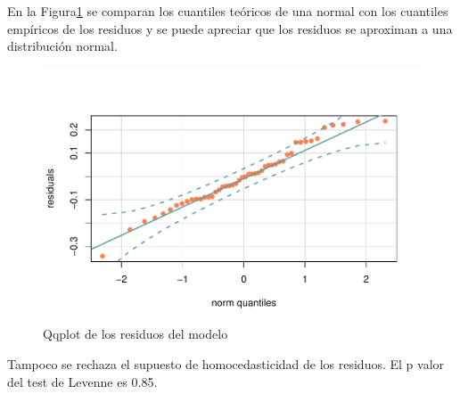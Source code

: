 \documentclass[a4paper,12pt]{article}
\begin{document}
En la Figura\ref{plot2} se comparan los cuantiles teóricos de una normal con los cuantiles empíricos de los residuos y se puede apreciar que los residuos se aproximan a una distribución normal.

\begin{figure}[H]
	\centering
	\caption{Qqplot de los residuos del modelo}
	\label{plot2}
	\includegraphics[scale=1]{plot2.pdf}
\end{figure}

Tampoco se rechaza el supuesto de homocedasticidad de los residuos. El p valor del test de Levenne es 0.85.
\end{document}

